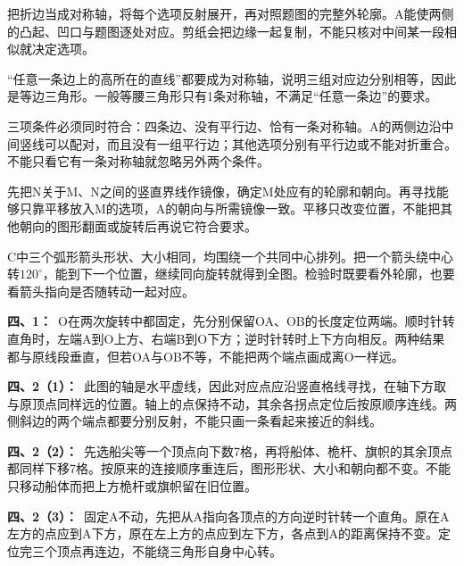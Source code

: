\documentclass[multi=snippet,border=0pt]{standalone}
\newenvironment{snippet}[3]{\begin{minipage}{#1bp}\color{answerred}\fontsize{#2}{#3}\selectfont\raggedright}{\end{minipage}}
\begin{document}
\begin{snippet}{505}{11.5}{14}把折边当成对称轴，将每个选项反射展开，再对照题图的完整外轮廓。A能使两侧的凸起、凹口与题图逐处对应。剪纸会把边缘一起复制，不能只核对中间某一段相似就决定选项。\end{snippet}
\begin{snippet}{505}{11.5}{14}“任意一条边上的高所在的直线”都要成为对称轴，说明三组对应边分别相等，因此是等边三角形。一般等腰三角形只有1条对称轴，不满足“任意一条边”的要求。\end{snippet}
\begin{snippet}{505}{11.5}{14}三项条件必须同时符合：四条边、没有平行边、恰有一条对称轴。A的两侧边沿中间竖线可以配对，而且没有一组平行边；其他选项分别有平行边或不能对折重合。不能只看它有一条对称轴就忽略另外两个条件。\end{snippet}
\begin{snippet}{505}{11.5}{14}先把N关于M、N之间的竖直界线作镜像，确定M处应有的轮廓和朝向。再寻找能够只靠平移放入M的选项，A的朝向与所需镜像一致。平移只改变位置，不能把其他朝向的图形翻面或旋转后再说它符合要求。\end{snippet}
\begin{snippet}{505}{11.5}{14}C中三个弧形箭头形状、大小相同，均围绕一个共同中心排列。把一个箭头绕中心转\(120^\circ\)，能到下一个位置，继续同向旋转就得到全图。检验时既要看外轮廓，也要看箭头指向是否随转动一起对应。\end{snippet}
\begin{snippet}{505}{11.5}{14}\textbf{四、1：}\ O在两次旋转中都固定，先分别保留OA、OB的长度定位两端。顺时针转直角时，左端A到O上方、右端B到O下方；逆时针转时上下方向相反。两种结果都与原线段垂直，但若OA与OB不等，不能把两个端点画成离O一样远。\end{snippet}
\begin{snippet}{505}{11.5}{14}\textbf{四、2（1）：}\ 此图的轴是水平虚线，因此对应点应沿竖直格线寻找，在轴下方取与原顶点同样远的位置。轴上的点保持不动，其余各拐点定位后按原顺序连线。两侧斜边的两个端点都要分别反射，不能只画一条看起来接近的斜线。\end{snippet}
\begin{snippet}{505}{11.5}{14}\textbf{四、2（2）：}\ 先选船尖等一个顶点向下数7格，再将船体、桅杆、旗帜的其余顶点都同样下移7格。按原来的连接顺序重连后，图形形状、大小和朝向都不变。不能只移动船体而把上方桅杆或旗帜留在旧位置。\end{snippet}
\begin{snippet}{505}{11.5}{14}\textbf{四、2（3）：}\ 固定A不动，先把从A指向各顶点的方向逆时针转一个直角。原在A左方的点应到A下方，原在左上方的点应到左下方，各点到A的距离保持不变。定位完三个顶点再连边，不能绕三角形自身中心转。\end{snippet}
\end{document}
